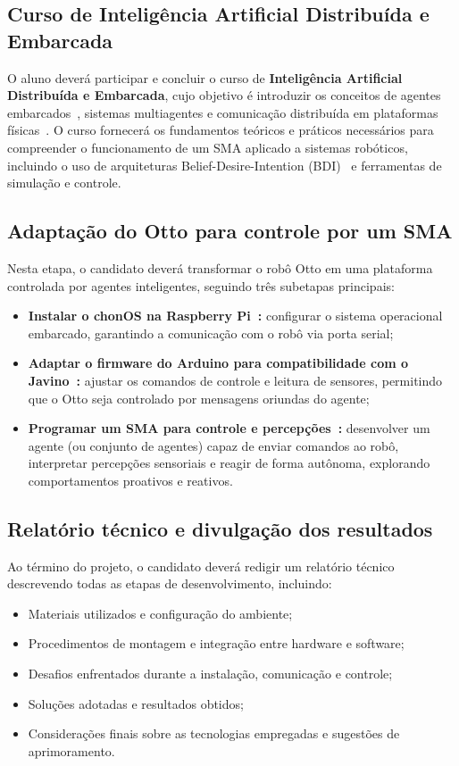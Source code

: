 \documentclass{ieeeojies}
\begin{document}
\subsection{Curso de Inteligência Artificial Distribuída e Embarcada}

O aluno deverá participar e concluir o curso de \textbf{Inteligência Artificial Distribuída e Embarcada}, cujo objetivo é introduzir os conceitos de agentes embarcados~\cite{brandao_engineering_2021}, sistemas multiagentes e comunicação distribuída em plataformas físicas~\cite{pantoja_argo_2016}. O curso fornecerá os fundamentos teóricos e práticos necessários para compreender o funcionamento de um SMA aplicado a sistemas robóticos, incluindo o uso de arquiteturas Belief-Desire-Intention (BDI)~\cite{Bratman1987} e ferramentas de simulação e controle.

\subsection{Adaptação do Otto para controle por um SMA}

Nesta etapa, o candidato deverá transformar o robô Otto em uma plataforma controlada por agentes inteligentes, seguindo três subetapas principais:
\begin{itemize}
    \item \textbf{Instalar o chonOS na Raspberry Pi~\cite{souza_de_jesus_ide_2023}:} configurar o sistema operacional embarcado, garantindo a comunicação com o robô via porta serial;
    \item \textbf{Adaptar o firmware do Arduino para compatibilidade com o Javino~\cite{lazarin_robotic-agent_2015}:} ajustar os comandos de controle e leitura de sensores, permitindo que o Otto seja controlado por mensagens oriundas do agente;
    \item \textbf{Programar um SMA para controle e percepções~\cite{pantoja_spin-off_2023}:} desenvolver um agente (ou conjunto de agentes) capaz de enviar comandos ao robô, interpretar percepções sensoriais e reagir de forma autônoma, explorando comportamentos proativos e reativos.
\end{itemize}

\subsection{Relatório técnico e divulgação dos resultados}

Ao término do projeto, o candidato deverá redigir um relatório técnico descrevendo todas as etapas de desenvolvimento, incluindo:
\begin{itemize}
    \item Materiais utilizados e configuração do ambiente;
    \item Procedimentos de montagem e integração entre hardware e software;
    \item Desafios enfrentados durante a instalação, comunicação e controle;
    \item Soluções adotadas e resultados obtidos;
    \item Considerações finais sobre as tecnologias empregadas e sugestões de aprimoramento.
\end{itemize}
\end{document}
